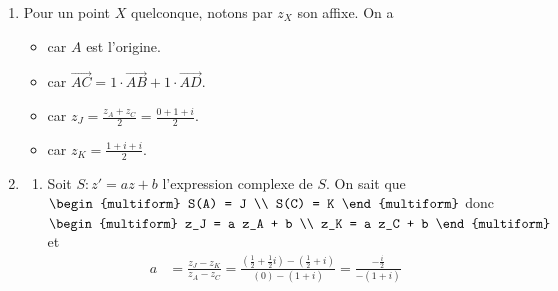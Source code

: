 \begin{description}
\begin{description}
\begin{enumerate}
\begin{enumerate}
                     \end{enumerate}
                  \end{enumerate}
               \item[II. ]
                  \begin{enumerate}
                     \item {}
                        Pour un point $X$ quelconque, notons par $z_X$ son affixe.
                        On a 
                        \begin{itemize}
                           \item {} car $A$ est l'origine.
                           \item {} car 
                              $\overrightarrow{AC}=1\cdot\overrightarrow{AB}+1\cdot\overrightarrow{AD}$.
                           \item {} car 
                              $z_J = \frac{z_A + z_C}{2} = \frac{0 + 1 + i}{2}$.
                           \item {} car
                              $z_K = \frac{1 + i + i}{2}$.
                        \end{itemize}
                     \item \begin{enumerate}
                              \item {}
                                 Soit $S : z' = az + b$ l'expression complexe de $S$.
                                 On sait que 
                                 $\begin{multiform} S(A) = J \\ S(C) = K \end{multiform}$ 
                                 donc 
                                 $\begin{multiform} z_J = a z_A + b \\ z_K = a z_C + b \end{multiform}$
                                 et 
                                 \begin{align*}
                                    a & = \frac{z_J - z_K}{z_A - z_C}      
                                        = \frac{(\frac{1}{2}+\frac{1}{2}i)-(\frac{1}{2}+i)}{(0)-(1+i)} 
                                        = \frac{-\frac{i}{2}}{-(1+i)}      \\

\end{align*}
\end{enumerate}
\end{enumerate}
\end{description}
\end{description}
